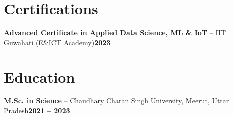 \documentclass[a4paper,10pt]{article}
\newcommand{\headrow}[2]{%
  {\parfillskip=0pt\relax\rightskip=0pt\relax #1\hfill #2\par}%
}
\begin{document}
\section{Certifications}
\headrow{\textbf{Advanced Certificate in Applied Data Science, ML \& IoT} -- IIT Guwahati (E\&ICT Academy)}{\textbf{2023}}

\section{Education}
\headrow{\textbf{M.Sc. in Science} -- Chaudhary Charan Singh University, Meerut, Uttar Pradesh}{\textbf{2021 -- 2023}}
\end{document}
